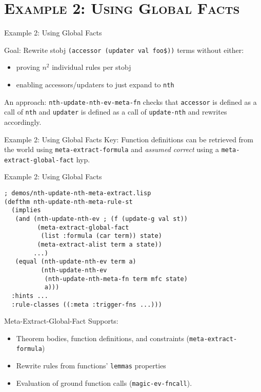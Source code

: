 \section[\scshape Example 2]{\scshape Example 2: Using Global Facts}
\begin{frame}[fragile]{Example 2: Using Global Facts}

Goal: Rewrite stobj \texttt{(accessor (updater val foo\$))} terms without either:
\begin{itemize}
\item proving $n^2$ individual rules per stobj
\item enabling accessors/updaters to just expand to \texttt{nth}
\end{itemize}
An approach: \texttt{nth-update-nth-ev-meta-fn} checks that
\texttt{accessor} is defined as a call of \texttt{nth} and
\texttt{updater} is defined as a call of \texttt{update-nth} and
rewrites accordingly.
\end{frame}
\begin{frame}[fragile]{Example 2: Using Global Facts}
  Key: Function definitions can be retrieved from the world using
  \texttt{meta-extract-formula} and \textit{assumed correct} using
  a \texttt{meta-extract-global-fact} hyp.
\end{frame}
\begin{frame}[fragile]{Example 2: Using Global Facts}

\begin{verbatim}
; demos/nth-update-nth-meta-extract.lisp
(defthm nth-update-nth-meta-rule-st
  (implies
   (and (nth-update-nth-ev ; (f (update-g val st))
         (meta-extract-global-fact
          (list :formula (car term)) state)
         (meta-extract-alist term a state))
        ...)
   (equal (nth-update-nth-ev term a)
          (nth-update-nth-ev
           (nth-update-nth-meta-fn term mfc state)
           a)))
  :hints ...
  :rule-classes ((:meta :trigger-fns ...)))
\end{verbatim}

\end{frame}
\begin{frame}[fragile]{Meta-Extract-Global-Fact}
Supports:
\begin{itemize}
\item Theorem bodies, function definitions, and constraints (\texttt{meta-extract-formula})
\item Rewrite rules from functions' \texttt{lemmas} properties
\item Evaluation of ground function calls (\texttt{magic-ev-fncall}).
\end{itemize}
\end{frame}
